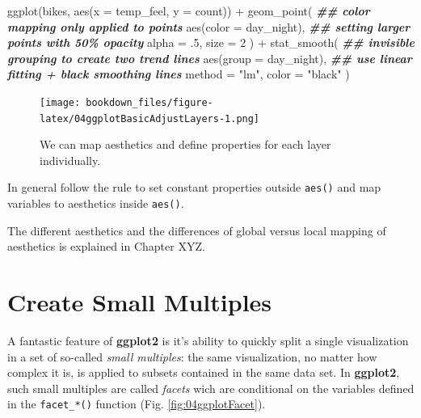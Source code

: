 \documentclass[
]{krantz}
\makeatletter
\newenvironment{Shaded}{\begin{snugshade}}{\end{snugshade}}
\newcommand{\AttributeTok}[1]{\textcolor[rgb]{0.61,0.61,0.61}{#1}}
\newcommand{\DecValTok}[1]{\textcolor[rgb]{0.06,0.06,0.06}{#1}}
\newcommand{\DocumentationTok}[1]{\textcolor[rgb]{0.37,0.37,0.37}{\textbf{\textit{#1}}}}
\newcommand{\FunctionTok}[1]{\textcolor[rgb]{0,0,0}{#1}}
\newcommand{\NormalTok}[1]{#1}
\newcommand{\SpecialCharTok}[1]{\textcolor[rgb]{0,0,0}{#1}}
\newcommand{\StringTok}[1]{\textcolor[rgb]{0.5,0.5,0.5}{#1}}
\newenvironment{kframe}{%
\medskip{}
\setlength{\fboxsep}{.8em}
 \def\at@end@of@kframe{}%
 \ifinner\ifhmode%
  \def\at@end@of@kframe{\end{minipage}}%
  \begin{minipage}{\columnwidth}%
 \fi\fi%
 \def\FrameCommand##1{\hskip\@totalleftmargin \hskip-\fboxsep
 \colorbox{shadecolor}{##1}\hskip-\fboxsep
     \hskip-\linewidth \hskip-\@totalleftmargin \hskip\columnwidth}%
 \MakeFramed {\advance\hsize-\width
   \@totalleftmargin\z@ \linewidth\hsize
   \@setminipage}}%
 {\par\unskip\endMakeFramed%
 \at@end@of@kframe}
\renewenvironment{Shaded}{\begin{kframe}}{\end{kframe}}
\makeatother
\begin{document}
\begin{Shaded}
\begin{Highlighting}[]
\FunctionTok{ggplot}\NormalTok{(bikes, }\FunctionTok{aes}\NormalTok{(}\AttributeTok{x =}\NormalTok{ temp\_feel, }\AttributeTok{y =}\NormalTok{ count)) }\SpecialCharTok{+} 
  \FunctionTok{geom\_point}\NormalTok{(}
    \DocumentationTok{\#\# color mapping only applied to points}
    \FunctionTok{aes}\NormalTok{(}\AttributeTok{color =}\NormalTok{ day\_night), }
    \DocumentationTok{\#\# setting larger points with 50\% opacity}
    \AttributeTok{alpha =}\NormalTok{ .}\DecValTok{5}\NormalTok{, }\AttributeTok{size =} \DecValTok{2}
\NormalTok{  ) }\SpecialCharTok{+} 
  \FunctionTok{stat\_smooth}\NormalTok{(}
    \DocumentationTok{\#\# invisible grouping to create two trend lines}
    \FunctionTok{aes}\NormalTok{(}\AttributeTok{group =}\NormalTok{ day\_night), }
    \DocumentationTok{\#\# use linear fitting + black smoothing lines}
    \AttributeTok{method =} \StringTok{"lm"}\NormalTok{, }\AttributeTok{color =} \StringTok{"black"}
\NormalTok{  )}
\end{Highlighting}
\end{Shaded}

\begin{figure}
\centering
\texttt{[image: bookdown\_files/figure-latex/04ggplotBasicAdjustLayers-1.png]}
\caption{\label{fig:04ggplotBasicAdjustLayers}We can map aesthetics and define properties for each layer individually.}
\end{figure}

In general follow the rule to set constant properties outside \texttt{aes()} and map variables to aesthetics inside \texttt{aes()}.

The different aesthetics and the differences of global versus local mapping of aesthetics is explained in Chapter XYZ.

\hypertarget{faceting}{%
\section{Create Small Multiples}\label{faceting}}

A fantastic feature of \textbf{ggplot2} is it's ability to quickly split a single visualization in a set of so-called \emph{small multiples}: the same visualization, no matter how complex it is, is applied to subsets contained in the same data set. In \textbf{ggplot2}, such small multiples are called \emph{facets} wich are conditional on the variables defined in the \texttt{facet\_*()} function (Fig. \ref{fig:04ggplotFacet}).
\end{document}
